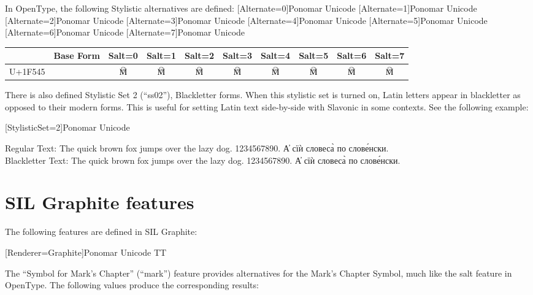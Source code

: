 In OpenType, the following Stylistic alternatives are defined:
\newfontfamily{\salt}[Alternate=0]{Ponomar Unicode}
\newfontfamily{\salta}[Alternate=1]{Ponomar Unicode}
\newfontfamily{\saltb}[Alternate=2]{Ponomar Unicode}
\newfontfamily{\saltc}[Alternate=3]{Ponomar Unicode}
\newfontfamily{\saltd}[Alternate=4]{Ponomar Unicode}
\newfontfamily{\salte}[Alternate=5]{Ponomar Unicode}
\newfontfamily{\saltf}[Alternate=6]{Ponomar Unicode}
\newfontfamily{\saltg}[Alternate=7]{Ponomar Unicode}

\begin{tabular}{lccccccccc}
	& Base Form	& Salt=0	& Salt=1	& Salt=2	& Salt=3 & Salt=4 & Salt=5 & Salt=6 & Salt=7 \\
\hline
U+1F545	& {\glyphfont{\large 🕅 }}	& {\salt\large 🕅} & {\salta\large 🕅} & {\saltb\large 🕅} & {\saltc\large 🕅} & {\saltd\large 🕅} & {\salte\large 🕅} & {\saltf\large 🕅} & {\saltg\large 🕅} \\
\hline
\end{tabular}

There is also defined Stylistic Set 2 (``ss02''), Blackletter forms. When this stylistic set is turned on, 
Latin letters appear in blackletter as opposed to their modern forms. This is useful for setting Latin text side-by-side with Slavonic in some contexts. See the following example:

\newfontfamily{\blackletter}[StylisticSet=2]{Ponomar Unicode}

Regular Text:
{\glyphfont \large The quick brown fox jumps over the lazy dog. 1234567890. А҆ сїѝ словеса̀ по слове́нски. } \\

Blackletter Text:
{\blackletter \large The quick brown fox jumps over the lazy dog. 1234567890. А҆ сїѝ словеса̀ по слове́нски.  } \\

\section{SIL Graphite features}

The following features are defined in SIL Graphite:

\newfontfamily{\graph}[Renderer=Graphite]{Ponomar Unicode TT}

The ``Symbol for Mark's Chapter'' (``mark'') feature provides alternatives for the Mark's Chapter Symbol, much like the salt feature in OpenType. 
The following values produce the corresponding results:

